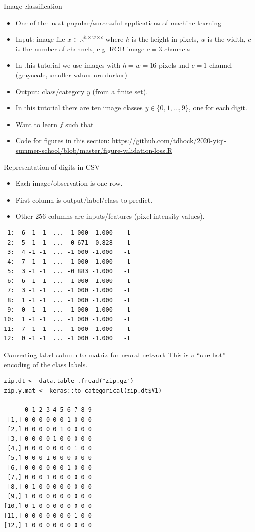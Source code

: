 \documentclass[12pt]{article}
\begin{document}
{Image classification}
  \begin{itemize}
  \item One of the most popular/successful applications of machine
    learning.
  \item Input: image file $x\in\mathbb R^{h\times w\times c}$ where
    $h$ is the height in pixels, $w$ is the width, $c$ is the number
    of channels, e.g. RGB image $c=3$ channels.
  \item In this tutorial we use images with $h=w=16$ pixels and $c=1$
    channel (grayscale, smaller values are darker).
  \item Output: class/category $y$ (from a finite set).
  \item In this tutorial there are ten image classes $y\in\{0, 1, \dots, 9\}$, one for each
    digit.
  \item Want to learn $f$ such that
  \item Code for figures in this section:
    \url{https://github.com/tdhock/2020-yiqi-summer-school/blob/master/figure-validation-loss.R}
  \end{itemize}

{Representation of digits in CSV}
  \begin{itemize}
  \item Each image/observation is one row.
  \item First column is output/label/class to predict.
  \item Other 256 columns are inputs/features (pixel intensity
    values).
  \end{itemize}
\begin{verbatim}
 1:  6 -1 -1  ... -1.000 -1.000   -1
 2:  5 -1 -1  ... -0.671 -0.828   -1
 3:  4 -1 -1  ... -1.000 -1.000   -1
 4:  7 -1 -1  ... -1.000 -1.000   -1
 5:  3 -1 -1  ... -0.883 -1.000   -1
 6:  6 -1 -1  ... -1.000 -1.000   -1
 7:  3 -1 -1  ... -1.000 -1.000   -1
 8:  1 -1 -1  ... -1.000 -1.000   -1
 9:  0 -1 -1  ... -1.000 -1.000   -1
10:  1 -1 -1  ... -1.000 -1.000   -1
11:  7 -1 -1  ... -1.000 -1.000   -1
12:  0 -1 -1  ... -1.000 -1.000   -1
\end{verbatim}

{Converting label column to matrix for neural network}
  This is a ``one hot'' encoding of the class labels.
\begin{verbatim}
zip.dt <- data.table::fread("zip.gz")
zip.y.mat <- keras::to_categorical(zip.dt$V1)

      0 1 2 3 4 5 6 7 8 9
 [1,] 0 0 0 0 0 0 1 0 0 0
 [2,] 0 0 0 0 0 1 0 0 0 0
 [3,] 0 0 0 0 1 0 0 0 0 0
 [4,] 0 0 0 0 0 0 0 1 0 0
 [5,] 0 0 0 1 0 0 0 0 0 0
 [6,] 0 0 0 0 0 0 1 0 0 0
 [7,] 0 0 0 1 0 0 0 0 0 0
 [8,] 0 1 0 0 0 0 0 0 0 0
 [9,] 1 0 0 0 0 0 0 0 0 0
[10,] 0 1 0 0 0 0 0 0 0 0
[11,] 0 0 0 0 0 0 0 1 0 0
[12,] 1 0 0 0 0 0 0 0 0 0
\end{verbatim}
\end{document}

